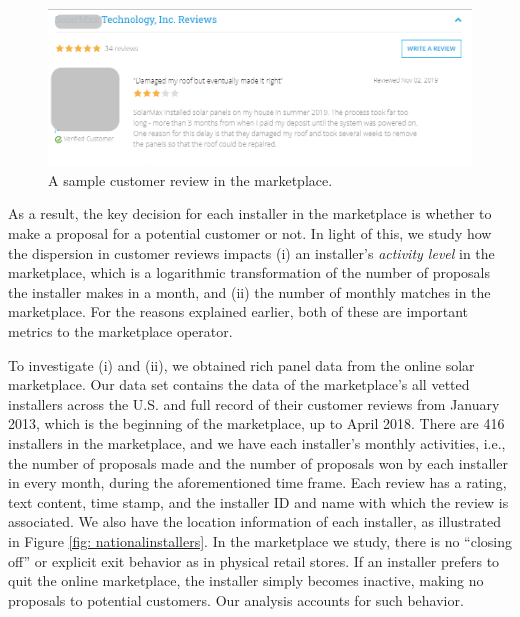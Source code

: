 \documentclass[msom,blindrev]{informs3}
\begin{document}
\begin{figure}
	\centering
	\includegraphics[width=0.81\linewidth]{reviews_example.png}
	\caption{A sample customer review in the marketplace.}
	\label{reviews_example}
\end{figure}

As a result, the key decision for each installer in the marketplace is whether to make a proposal for a potential customer or not. In light of this, we study how the dispersion in customer reviews impacts (i) an installer's \emph{activity level} in the marketplace, which is a logarithmic transformation of the number of proposals the installer makes in a month, and (ii) the number of monthly matches in the marketplace. For the reasons explained earlier, both of these are important metrics to the marketplace operator.



To investigate (i) and (ii), we obtained rich panel data from the online solar marketplace. Our data set contains the data of the marketplace's all vetted installers across the U.S. and full record of their customer reviews from January 2013, which is the beginning of the marketplace, up to April 2018. There are 416 installers in the marketplace, and we have each installer's monthly activities, i.e., the number of proposals made and the number of proposals won by each installer in every month, during the aforementioned time frame. Each review has a rating, text content, time stamp, and the installer ID and name with which the review is associated. We also have the location information of each installer, as illustrated in Figure \ref{fig: nationalinstallers}. In the marketplace we study, there is no ``closing off'' or explicit exit behavior as in physical retail stores. If an installer prefers to quit the online marketplace, the installer simply becomes inactive, making no proposals to potential customers. Our analysis accounts for such behavior.



%
\end{document}
